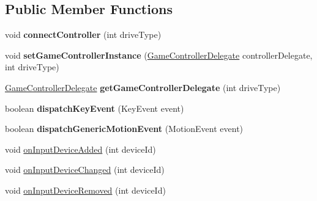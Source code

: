 \subsection*{Public Member Functions}
\begin{DoxyCompactItemize}
\item 
\mbox{\label{classorg_1_1cocos2dx_1_1lib_1_1GameControllerActivity_a87bc928c87d5c864a926cfd2d65321b0}} 
void {\bfseries connect\+Controller} (int drive\+Type)
\item 
\mbox{\label{classorg_1_1cocos2dx_1_1lib_1_1GameControllerActivity_a1c55b30c56611ba907bfe7195feedc1d}} 
void {\bfseries set\+Game\+Controller\+Instance} (\hyperlink{interfaceorg_1_1cocos2dx_1_1lib_1_1GameControllerDelegate}{Game\+Controller\+Delegate} controller\+Delegate, int drive\+Type)
\item 
\mbox{\label{classorg_1_1cocos2dx_1_1lib_1_1GameControllerActivity_a71905b8072d49fb1c0eab7f7815531d7}} 
\hyperlink{interfaceorg_1_1cocos2dx_1_1lib_1_1GameControllerDelegate}{Game\+Controller\+Delegate} {\bfseries get\+Game\+Controller\+Delegate} (int drive\+Type)
\item 
\mbox{\label{classorg_1_1cocos2dx_1_1lib_1_1GameControllerActivity_a07b3eca220c62f9d78f481afbc4519ae}} 
boolean {\bfseries dispatch\+Key\+Event} (Key\+Event event)
\item 
\mbox{\label{classorg_1_1cocos2dx_1_1lib_1_1GameControllerActivity_aa47a8a2433311b1d52754ef443aa7cb9}} 
boolean {\bfseries dispatch\+Generic\+Motion\+Event} (Motion\+Event event)
\item 
void \hyperlink{classorg_1_1cocos2dx_1_1lib_1_1GameControllerActivity_a25ed4cb26b6bac381d1befce69f7e638}{on\+Input\+Device\+Added} (int device\+Id)
\item 
void \hyperlink{classorg_1_1cocos2dx_1_1lib_1_1GameControllerActivity_a26ce9a1e1b6f4a726d6c775633a80b03}{on\+Input\+Device\+Changed} (int device\+Id)
\item 
void \hyperlink{classorg_1_1cocos2dx_1_1lib_1_1GameControllerActivity_aec412cd3d3092fa8d9c0a90567062111}{on\+Input\+Device\+Removed} (int device\+Id)

\end{DoxyCompactItemize}
